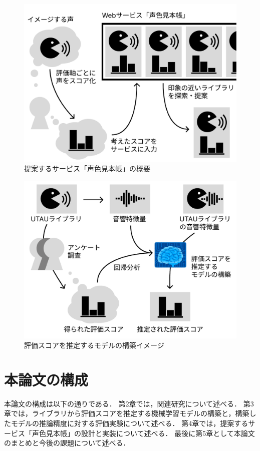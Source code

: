 \begin{figure}[htb]
  \centering
  \includegraphics[width=0.9\linewidth]{fig/fig1.pdf}
  \caption{提案するサービス「声色見本帳」の概要}
  \label{fig:fig1}
\end{figure}

\begin{figure}[htb]
  \centering
  \includegraphics[width=0.9\linewidth]{fig/fig2.pdf}
  \caption{評価スコアを推定するモデルの構築イメージ}
  \label{fig:fig2}
\end{figure}

\section{本論文の構成}
本論文の構成は以下の通りである．
第2章では，関連研究について述べる．
第3章では，ライブラリから評価スコアを推定する機械学習モデルの構築と，構築したモデルの推論精度に対する評価実験について述べる．
第4章では，提案するサービス「声色見本帳」の設計と実装について述べる．
最後に第5章として本論文のまとめと今後の課題について述べる．

